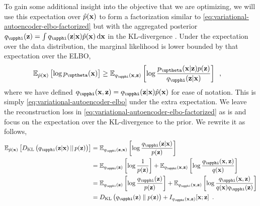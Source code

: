 To gain some additional insight into the objective that we are optimizing, we will use this expectation over $\hat{p}({\mathbf{x}})$ to form a factorization similar to \cref{eq:variational-autoencoder-elbo-factorized} but with the aggregated posterior $q_\phib(\zb) = \int q_\phib(\zb|\xb)\hat{p}(\xb)\,\mathrm{d}\xb$ in the KL-divergence \parencite{tomczak_trouble_2022}. 
Under the expectation over the data distribution, the marginal likelihood is lower bounded by that expectation over the ELBO,
%
\begin{align} \label{eq:variational-autoencoder-elbo-expected}
    \mathbb{E}_{\hat{p}(\xb)}\left[ \log p_\thetab(\xb) \right] 
    &\geq \mathbb{E}_{q_{\phib}(\xb,\zb)}\left[ \log \frac{p_{\thetab}(\xb|\zb)p(\zb)}{q_{\phib}(\zb|\xb)} \right] \enspace ,
\end{align}
%
where we have defined $q_{\phib}(\xb,\zb) = q_{\phib}(\zb|\xb)\hat{p}(\xb)$ for ease of notation. This is simply \cref{eq:variational-autoencoder-elbo} under the extra expectation. 
We leave the reconstruction loss in \cref{eq:variational-autoencoder-elbo-factorized} as is and focus on the expectation over the KL-divergence to the prior. We rewrite it as follows,
%
\begin{align} \label{eq:variational-autoencoder-kl-factor-expected}
    \mathbb{E}_{\hat{p}(\xb)} \left[ D_\text{KL}\left( q_{\phib}(\zb|\xb) \,||\, p(\zb) \right) \right]
    &= \mathbb{E}_{q_{\phib}(\zb,\xb)} \left[ \log \frac{q_{\phib}(\zb|\xb)}{p(\zb)}\right] \nonumber \\
    &= \mathbb{E}_{q_{\phib}(\zb)}\left[ \log \frac{1}{p(\zb)} \right] + \mathbb{E}_{q_{\phib}(\xb,\zb)}\left[ \log \frac{q_{\phib}(\xb,\zb)}{q(\xb)} \right] \nonumber \\
    &= \mathbb{E}_{q_{\phib}(\zb)}\left[ \log \frac{q_{\phib}(\zb)}{p(\zb)} \right] + \mathbb{E}_{q_{\phib}(\xb,\zb)}\left[ \log \frac{q_{\phib}(\xb,\zb)}{q(\xb)q_{\phib}(\zb)} \right] \nonumber \\
    &= D_\mathrm{KL}\left( q_{\phib}(\zb) \parallel p(\zb) \right) + I_{q_{\phib}(\xb,\zb)}[\xb;\zb] \enspace .
\end{align}
